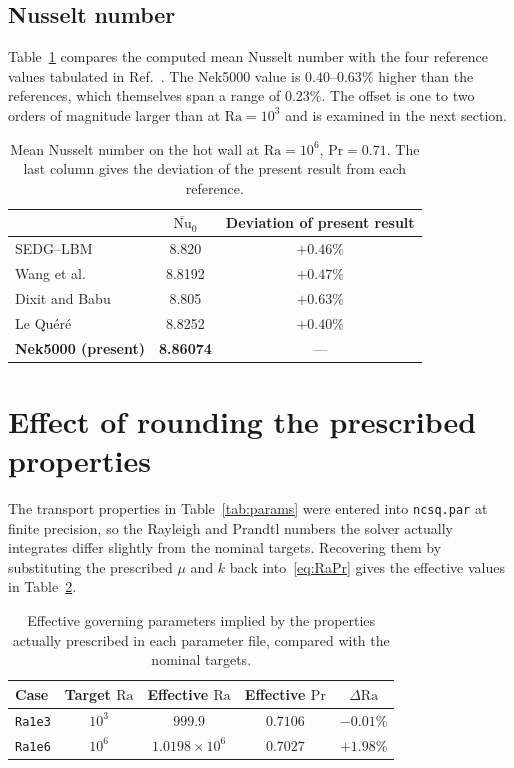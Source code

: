 \documentclass[11pt,a4paper]{article}
\begin{document}
\subsection{Nusselt number}
Table~\ref{tab:nu6} compares the computed mean Nusselt number with the four
reference values tabulated in Ref.~\cite{patel2014}. The Nek5000 value is
$0.40$--$0.63\%$ higher than the references, which themselves span a range of
$0.23\%$. The offset is one to two orders of magnitude larger than at
$\mathrm{Ra}=10^{3}$ and is examined in the next section.

\begin{table}[htbp]
\centering
\caption{Mean Nusselt number on the hot wall at $\mathrm{Ra}=10^{6}$,
$\mathrm{Pr}=0.71$. The last column gives the deviation of the present result
from each reference.}
\label{tab:nu6}
\begin{tabular}{lcc}
\toprule
 & $\overline{\mathrm{Nu}}_0$ & Deviation of present result\\
\midrule
SEDG--LBM~\cite{patel2014} & 8.820 & $+0.46\%$\\
Wang et al.~\cite{wang2013} & 8.8192 & $+0.47\%$\\
Dixit and Babu~\cite{dixit2006} & 8.805 & $+0.63\%$\\
Le Qu\'er\'e~\cite{lequere1991} & 8.8252 & $+0.40\%$\\
\textbf{Nek5000 (present)} & \textbf{8.86074} & ---\\
\bottomrule
\end{tabular}
\end{table}

\section{Effect of rounding the prescribed properties}
\label{sec:rounding}
The transport properties in Table~\ref{tab:params} were entered into
\texttt{ncsq.par} at finite precision, so the Rayleigh and Prandtl numbers the
solver actually integrates differ slightly from the nominal targets. Recovering
them by substituting the prescribed $\mu$ and $k$ back
into~\eqref{eq:RaPr} gives the effective values in Table~\ref{tab:effective}.

\begin{table}[htbp]
\centering
\caption{Effective governing parameters implied by the properties actually
prescribed in each parameter file, compared with the nominal targets.}
\label{tab:effective}
\begin{tabular}{lcccc}
\toprule
Case & Target $\mathrm{Ra}$ & Effective $\mathrm{Ra}$ & Effective $\mathrm{Pr}$
 & $\Delta\mathrm{Ra}$\\
\midrule
\texttt{Ra1e3} & $10^{3}$ & $999.9$ & $0.7106$ & $-0.01\%$\\
\texttt{Ra1e6} & $10^{6}$ & $1.0198\times10^{6}$ & $0.7027$ & $+1.98\%$\\
\bottomrule
\end{tabular}
\end{table}
\end{document}
